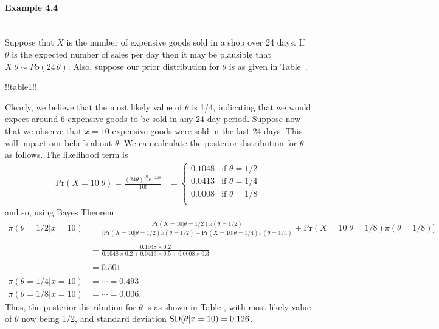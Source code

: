 \paragraph{Example 4.4}{~\\
Suppose that $X$ is the number of expensive goods sold in a shop over 24 days. If $\theta$ is the expected number of sales per day then it may be plausible that $X|\theta\sim Po(24\,\theta)$. Also, suppose our prior distribution for $\theta$ is as given in Table~.



!!table1!!

Clearly, we believe that the most likely value of $\theta$ is 1/4, indicating that we would expect around 6 expensive goods to be sold in any 24 day period. Suppose now that we observe that $x=10$ expensive goods were sold in the last 24 days. This will impact our beliefs about $\theta$. We can calculate the posterior distribution for
$\theta$ as follows. The likelihood term is
\begin{align*}
\text{Pr}(X=10|\theta)
=\frac{(24\theta)^{10} e^{-24\theta}}{10!} 
&=\begin{cases} 0.1048 & \text{if }\theta=1/2 \\
                 0.0413 & \text{if }\theta=1/4 \\
                 0.0008 & \text{if }\theta=1/8\\
   \end{cases}
\end{align*}
and so, using Bayes Theorem
\begin{align*}
\pi(\theta=1/2|x=10)&=\frac{\text{Pr}(X=10|\theta=1/2)\pi(\theta=1/2)}
{[\text{Pr}(X=10|\theta=1/2)\pi(\theta=1/2)+\text{Pr}(X=10|\theta=1/4)\pi(\theta=1/4)} +\text{Pr}(X=10|\theta=1/8)\pi(\theta=1/8)] \\
& \\
&=\frac{0.1048\times 0.2}{0.1048\times 0.2+0.0413\times
0.5+0.0008\times 0.3} \\ \\
&=0.501 \\ \\
\pi(\theta=1/4|x=10)&=\cdots=0.493 \\
\pi(\theta=1/8|x=10)&=\cdots=0.006.
\end{align*}
Thus, the posterior distribution for $\theta$ is as shown in Table , with most likely value of $\theta$ now being 1/2, and standard deviation $\textnormal{SD}(\theta|x=10)=0.126$.



}
